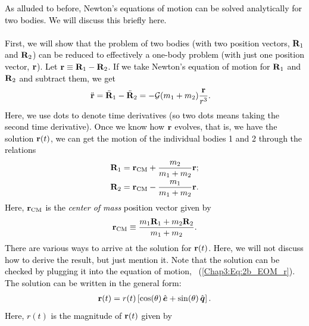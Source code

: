 \documentclass[main.tex]{subfiles}
\begin{document}
\begin{tcolorbox}[sharp corners, colback=blue!30, colframe=blue!80!blue, title=Orbital Dynamics III$^6$]
\par \textcolor{black}{As alluded to before, Newton's equations of motion can be solved analytically for two bodies. We will discuss this briefly here. \\ \\
First, we will show that the problem of two bodies (with two position vectors, ${\mathbf{R}}_1$ and ${\mathbf{R}}_2$) can be reduced to effectively a one-body problem (with just one position vector, ${\mathbf{r}}$). Let ${\mathbf{r}} \equiv {\mathbf{R}}_1 - {\mathbf{R}}_2$. If we take Newton's equation of motion for ${\mathbf{R}}_1$ and ${\mathbf{R}}_2$ and subtract them, we get
\begin{align}
\label{Chap3:Eq:2b_EOM_r}
\ddot{{\mathbf{r}}} &= \ddot{{\mathbf{R}}}_1 - \ddot{{\mathbf{R}}}_2 =  -\mathcal{G} (m_1+m_2)  \frac{{\mathbf{r}}}{r^3}.
\end{align}
Here, we use dots to denote time derivatives (so two dots means taking the second time derivative). Once we know how ${\mathbf{r}}$ evolves, that is, we have the solution ${\mathbf{r}}(t)$, we can get the motion of the individual bodies 1 and 2 through the relations
\begin{subequations}
\label{Chap3:Eq:R_r_relations}
\begin{align}
{\mathbf{R}}_1 &= {\mathbf{r}}_\mathrm{CM} + \frac{m_2}{m_1+m_2} {\mathbf{r}}; \\
{\mathbf{R}}_2 &= {\mathbf{r}}_\mathrm{CM} - \frac{m_1}{m_1+m_2} {\mathbf{r}}.
\end{align}
\end{subequations}
Here, ${\mathbf{r}}_\mathrm{CM}$ is the {\it center of mass} position vector given by
\begin{align}
\label{Chap3:Eq:r_CM_def}
{\mathbf{r}}_\mathrm{CM} \equiv \frac{m_1 {\mathbf{R}}_1 + m_2 {\mathbf{R}}_2}{m_1+m_2}.
\end{align} 
There are various ways to arrive at the solution for ${\mathbf{r}}(t)$. Here, we will not discuss how to derive the result, but just mention it. Note that the solution can be checked by plugging it into the equation of motion, \Eq~(\ref{Chap3:Eq:2b_EOM_r}). The solution can be written in the general form:
\begin{align}
\label{Chap3:Eq:r_sol}
{\mathbf{r}}(t) = r(t) \left [ \cos(\theta) \, \hat{\boldsymbol{e}} + \sin(\theta) \, \hat{\boldsymbol{q}} \right ].
\end{align}
Here, $r(t)$ is the magnitude of ${\mathbf{r}}(t)$ given by
\begin{align}

\end{align}}
\end{tcolorbox}
\end{document}
